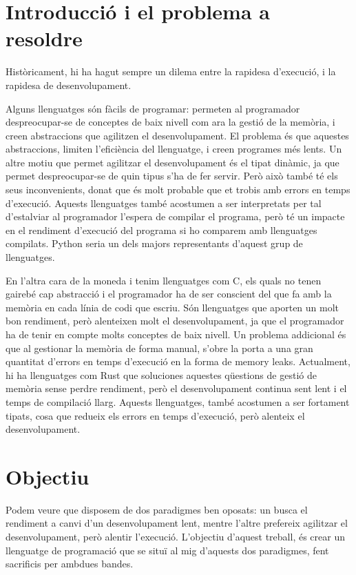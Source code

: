 ﻿\documentclass{article}
\begin{document}
\section{Introducció i el problema a resoldre}
Històricament, hi ha hagut sempre un dilema entre la rapidesa d'execució, i la
rapidesa de desenvolupament.

Alguns llenguatges són fàcils de programar: permeten al programador
despreocupar-se de conceptes de baix nivell com ara la gestió de la memòria,
i creen abstraccions que agilitzen el desenvolupament. El problema és que
aquestes abstraccions, limiten l'eficiència del llenguatge, i creen programes
més lents. Un altre motiu que permet agilitzar el desenvolupament és el tipat
dinàmic, ja que permet despreocupar-se de quin tipus s'ha de fer servir. Però
això també té els seus inconvenients, donat que és molt probable que et trobis amb
errors en temps d'execució. Aquests llenguatges també acostumen a ser interpretats
per tal d'estalviar al programador l'espera de compilar el programa, però té
un impacte en el rendiment d'execució del programa si ho comparem amb llenguatges
compilats. Python seria un dels majors representants d'aquest grup de llenguatges.

En l'altra cara de la moneda i tenim llenguatges com C, els quals no tenen gairebé
cap abstracció i el programador ha de ser conscient del que fa amb la memòria en
cada línia de codi que escriu. Són llenguatges que aporten un molt bon rendiment,
però alenteixen molt el desenvolupament, ja que el programador ha de tenir en
compte molts conceptes de baix nivell.
Un problema addicional és que al gestionar la memòria de forma manual, s'obre
la porta a una gran quantitat d'errors en temps d'execució en la forma de
memory leaks. Actualment, hi ha llenguatges com Rust que soluciones aquestes
qüestions de gestió de memòria sense perdre rendiment, però el desenvolupament
continua sent lent i el temps de compilació llarg. Aquests llenguatges, també
acostumen a ser fortament tipats, cosa que redueix els errors en temps
d'execució, però alenteix el desenvolupament.


\section{Objectiu}

Podem veure que disposem de dos paradigmes ben oposats: un busca el rendiment a
canvi d'un desenvolupament lent, mentre l'altre prefereix agilitzar el
desenvolupament, però alentir l'execució. L'objectiu d'aquest treball,
és crear un llenguatge de programació que se situï al mig d'aquests dos
paradigmes, fent sacrificis per ambdues bandes.
\end{document}

